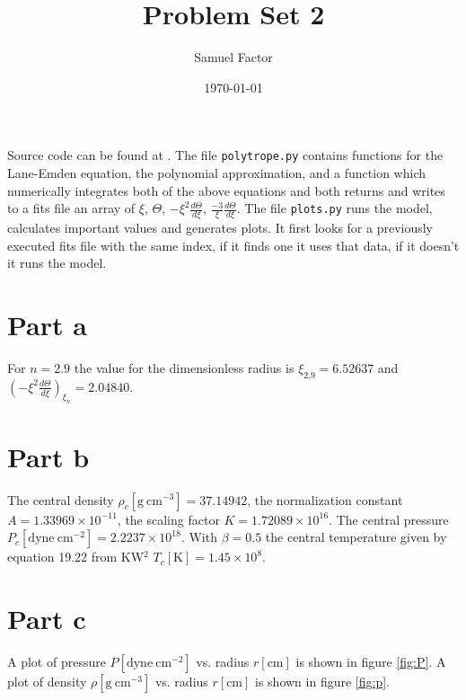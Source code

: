 \documentclass[12pt]{article}
\title{\vspace{-1in}Problem Set 2}
\author{Samuel Factor}
\date{\today}                                           %
\begin{document}
\maketitle

Source code can be found at \url{}. The file \texttt{polytrope.py} contains functions for the Lane-Emden equation, the polynomial approximation, and a function which numerically integrates both of the above equations and both returns and writes to a fits file an array of $\xi$, $\Theta$, $-\xi^2 \frac{d\Theta}{d\xi}$, $\frac{-3}{\xi}\frac{d\Theta}{d\xi}$. The file \texttt{plots.py} runs the model, calculates important values and generates plots. It first looks for a previously executed fits file with the same index, if it finds one it uses that data, if it doesn't it runs the model. 

\section{Part a}
For $n=2.9$ the value for the dimensionless radius is $\xi_{2.9}=6.52637$ and $(-\xi^2\frac{d\Theta}{d\xi})_{\xi_n}=2.04840$.

\section{Part b}
The central density $\rho_c [\mathrm{g~cm^{-3}}] =37.14942$, the normalization constant $A=1.33969\times10^{-11}$, the scaling factor $K=1.72089\times10^{16}$. The central pressure $P_c [\mathrm{dyne~cm^{-2}}] = 2.2237\times10^{18}$. With $\beta=0.5$ the central temperature given by equation 19.22 from KW$^2$ $T_c[\mathrm{K}]=1.45\times10^8$.

\section{Part c}
A plot of pressure $P [\mathrm{dyne~cm^{-2}}]$ vs. radius $r [\mathrm{cm}]$ is shown in figure \ref{fig:P}. A plot of density $\rho [\mathrm{g~cm^{-3}}]$ vs. radius $r [\mathrm{cm}]$ is shown in figure \ref{fig:p}.
\end{document}
